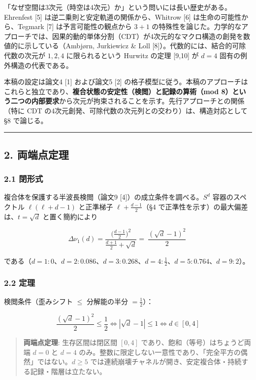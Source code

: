 \documentclass[
]{ltjsarticle}
\begin{document}
「なぜ空間は3次元（時空は4次元）か」という問いには長い歴史がある。Ehrenfest
{[}5{]} は逆二乗則と安定軌道の関係から、Whitrow {[}6{]}
は生命の可能性から、Tegmark {[}7{]} は予言可能性の観点から \(3{+}1\)
の特殊性を論じた。力学的なアプローチでは、因果的動的単体分割（CDT）が4次元的なマクロ構造の創発を数値的に示している（Ambjørn,
Jurkiewicz \& Loll {[}8{]}）。代数的には、結合的可除代数の次元が
\(1,2,4\) に限られるという Hurwitz の定理 {[}9,10{]} が \(d=4\)
固有の例外構造の代表である。

本稿の設定は論文4 {[}1{]} および論文5 {[}2{]}
の格子模型に従う。本稿のアプローチはこれらと独立であり、\textbf{複合状態の安定性（検閲）と記録の算術（mod
8）という二つの内部要求}から次元が拘束されることを示す。先行アプローチとの関係（特に
CDT の4次元創発、可除代数の次元列との交わり）は、構造対応として §8
で論じる。

\begin{center}\rule{0.5\linewidth}{0.5pt}\end{center}

\subsection{2. 両端点定理}\label{ux4e21ux7aefux70b9ux5b9aux7406}

\subsubsection{2.1 閉形式}\label{ux9589ux5f62ux5f0f}

複合体を保護する半波長検閲（論文9 {[}4{]}）の成立条件を調べる。\(S^d\)
容器のスペクトル \(\ell(\ell+d-1)\) と正準梯子 \(\ell+\tfrac{d-1}2\)（§4
で正準性を示す）の最大偏差は、\(t=\sqrt d\) と置く簡約により

\[
\Delta\nu_1(d)=\frac{\bigl(\tfrac{d-1}2\bigr)^2}{\tfrac{d+1}2+\sqrt d}=\boxed{\ \frac{(\sqrt d-1)^2}{2}\ }
\]

である（\(d=1:0\)、\(d=2:0.086\)、\(d=3:0.268\)、\(d=4:\tfrac12\)、\(d=5:0.764\)、\(d=9:2\)）。

\subsubsection{2.2 定理}\label{ux5b9aux7406}

検閲条件（歪みシフト $\le$ 分解能の半分 \(=\tfrac12\)）：

\[
\frac{(\sqrt d-1)^2}{2}\le\frac12\iff|\sqrt d-1|\le1\iff d\in[0,4]
\]

\begin{quote}
\textbf{両端点定理}: 生存区間は閉区間 \([0,4]\)
であり、飽和（等号）はちょうど両端 \(d=0\) と \(d=4\)
のみ。整数に限定しない一意性であり、「完全平方の偶然」ではない。\(d\ge5\)
では連続崩壊チャネルが開き、安定複合体・持続する記録・階層は立たない。
\end{quote}
\end{document}
